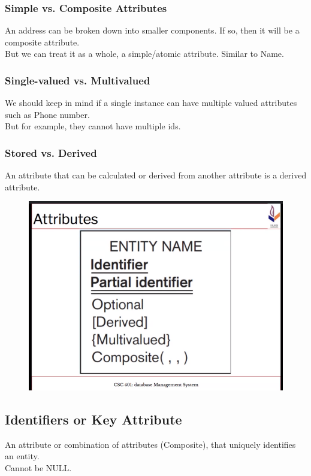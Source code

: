 \documentclass{article}
\begin{document}
            \subsubsection{Simple vs. Composite Attributes}
                An address can be broken down into smaller components. If so, then it will be a composite attribute.\\
                But we can treat it as a whole, a simple/atomic attribute. Similar to Name. 
            \subsubsection{Single-valued vs. Multivalued}
                We should keep in mind if a single instance can have multiple valued attributes such as Phone number.\\
                But for example, they cannot have multiple ids.
            \subsubsection{Stored vs. Derived}
                An attribute that can be calculated or derived from another attribute is a derived attribute.
            \begin{figure}[h]
                \centerline{
                    \includegraphics[scale=0.2]{Entity rules.png}
                }
            \end{figure}
        \subsection{Identifiers or Key Attribute}
            An attribute or combination of attributes (Composite), that uniquely identifies an entity.\\
            Cannot be NULL.
        
\end{document}
